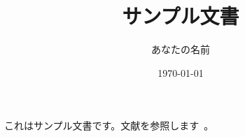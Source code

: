\documentclass{jsarticle}
\title{サンプル文書}
\author{あなたの名前}
\date{\today}
\begin{document}
\maketitle
これはサンプル文書です。文献を参照します~\cite{G_ng_r_2021}。

\printbibliography[title=参考文献]
\end{document}
